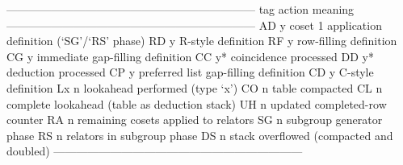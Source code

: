 \begintt
------------------------------------------------------------------
tag   action      meaning
------------------------------------------------------------------
AD         y      coset 1 application definition (`SG'/`RS' phase)
RD         y      R-style definition
RF         y      row-filling definition
CG         y      immediate gap-filling definition
CC         y*     coincidence processed
DD         y*     deduction processed
CP         y      preferred list gap-filling definition
CD         y      C-style definition
Lx         n      lookahead performed (type `x')
CO         n      table compacted
CL         n      complete lookahead (table as deduction stack)
UH         n      updated completed-row counter
RA         n      remaining cosets applied to relators
SG         n      subgroup generator phase
RS         n      relators in subgroup phase
DS         n      stack overflowed (compacted and doubled)
------------------------------------------------------------------
\endtt


